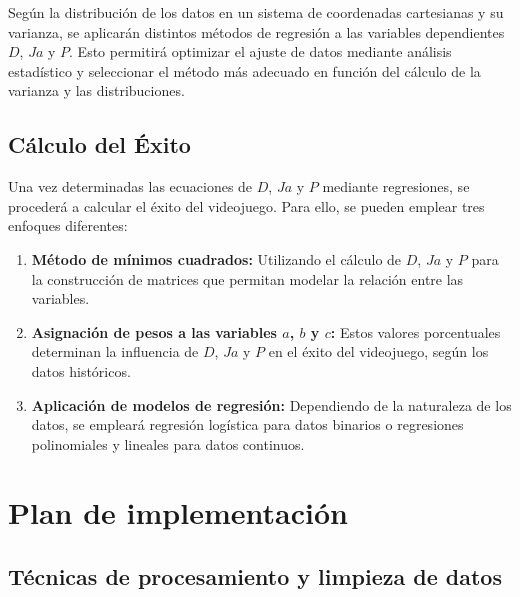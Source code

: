 \documentclass[titlepage,a4paper]{article}
\begin{document}
Según la distribución de los datos en un sistema de coordenadas cartesianas y su varianza, se aplicarán distintos métodos de regresión a las variables dependientes $D$, $Ja$ y $P$. Esto permitirá optimizar el ajuste de datos mediante análisis estadístico y seleccionar el método más adecuado en función del cálculo de la varianza y las distribuciones. \\

\subsection{Cálculo del Éxito}

Una vez determinadas las ecuaciones de $D$, $Ja$ y $P$ mediante regresiones, se procederá a calcular el éxito del videojuego. Para ello, se pueden emplear tres enfoques diferentes: \\

\begin{enumerate}
    \item \textbf{Método de mínimos cuadrados:} Utilizando el cálculo de $D$, $Ja$ y $P$ para la construcción de matrices que permitan modelar la relación entre las variables. \\
    
    \item \textbf{Asignación de pesos a las variables $a$, $b$ y $c$:} Estos valores porcentuales determinan la influencia de $D$, $Ja$ y $P$ en el éxito del videojuego, según los datos históricos. \\
    
    \item \textbf{Aplicación de modelos de regresión:} Dependiendo de la naturaleza de los datos, se empleará regresión logística para datos binarios o regresiones polinomiales y lineales para datos continuos.
\end{enumerate}


\vspace{1cm}


\section{Plan de implementación}

\subsection{Técnicas de procesamiento y limpieza de datos}
\end{document}
